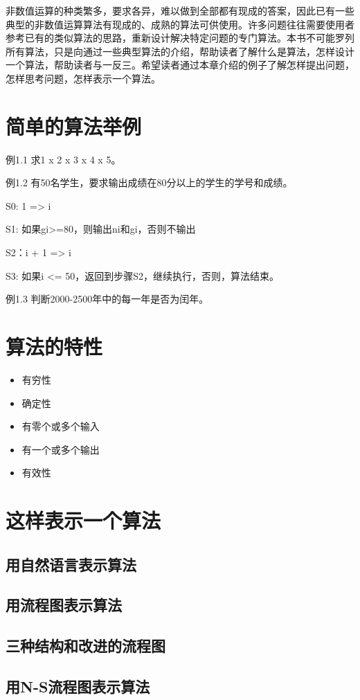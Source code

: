 非数值运算的种类繁多，要求各异，难以做到全部都有现成的答案，因此已有一些典型的非数值运算算法有现成的、成熟的算法可供使用。许多问题往往需要使用者参考已有的类似算法的思路，重新设计解决特定问题的专门算法。本书不可能罗列所有算法，只是向通过一些典型算法的介绍，帮助读者了解什么是算法，怎样设计一个算法，帮助读者与一反三。希望读者通过本章介绍的例子了解怎样提出问题，怎样思考问题，怎样表示一个算法。

\section{简单的算法举例}

例1.1 求1 x 2 x 3 x 4 x 5。

例1.2 有50名学生，要求输出成绩在80分以上的学生的学号和成绩。

S0: 1 => i

S1: 如果gi>=80，则输出ni和gi，否则不输出

S2：i + 1 => i

S3: 如果i <= 50，返回到步骤S2，继续执行，否则，算法结束。

例1.3 判断2000-2500年中的每一年是否为闰年。

\section{算法的特性}
\begin{itemize}
	\item 有穷性
	\item 确定性
	\item 有零个或多个输入
	\item 有一个或多个输出
	\item 有效性
\end{itemize}

\section{这样表示一个算法}
\subsection{用自然语言表示算法}
\subsection{用流程图表示算法}
\subsection{三种结构和改进的流程图}
\subsection{用N-S流程图表示算法}
